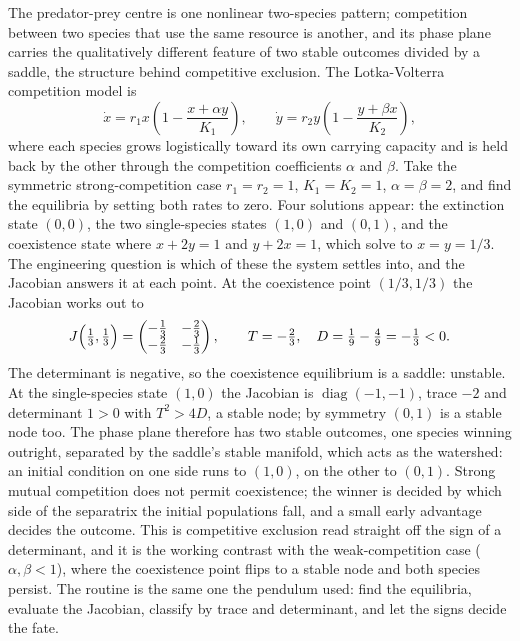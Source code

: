 The predator-prey centre is one nonlinear two-species pattern; competition
between two species that use the same resource is another, and its phase
plane carries the qualitatively different feature of two stable outcomes
divided by a saddle, the structure behind competitive exclusion. The
Lotka-Volterra competition model is
\[
\dot{x} = r_{1} x\left(1 - \frac{x + \alpha y}{K_{1}}\right),
\qquad
\dot{y} = r_{2} y\left(1 - \frac{y + \beta x}{K_{2}}\right),
\]
where each species grows logistically toward its own carrying capacity
and is held back by the other through the competition coefficients
$\alpha$ and $\beta$. Take the symmetric strong-competition case $r_{1} =
r_{2} = 1$, $K_{1} = K_{2} = 1$, $\alpha = \beta = 2$, and find the
equilibria by setting both rates to zero. Four solutions appear: the
extinction state $(0, 0)$, the two single-species states $(1, 0)$ and
$(0, 1)$, and the coexistence state where $x + 2y = 1$ and $y + 2x = 1$,
which solve to $x = y = 1/3$. The engineering question is which of these
the system settles into, and the Jacobian answers it at each point. At
the coexistence point $(1/3, 1/3)$ the Jacobian works out to
\[
J\Bigl(\tfrac13, \tfrac13\Bigr) = \begin{pmatrix}
-\tfrac13 & -\tfrac23 \\ -\tfrac23 & -\tfrac13
\end{pmatrix},
\qquad
T = -\tfrac23, \quad D = \tfrac19 - \tfrac49 = -\tfrac13 < 0.
\]
The determinant is negative, so the coexistence equilibrium is a saddle:
unstable. At the single-species state $(1, 0)$ the Jacobian is
$\operatorname{diag}(-1, -1)$, trace $-2$ and determinant $1 > 0$ with
$T^{2} > 4D$, a stable node; by symmetry $(0, 1)$ is a stable node too.
The phase plane therefore has two stable outcomes, one species winning
outright, separated by the saddle's stable manifold, which acts as the
watershed: an initial condition on one side runs to $(1, 0)$, on the
other to $(0, 1)$. Strong mutual competition does not permit coexistence;
the winner is decided by which side of the separatrix the initial
populations fall, and a small early advantage decides the outcome. This
is competitive exclusion read straight off the sign of a determinant, and
it is the working contrast with the weak-competition case ($\alpha,
\beta < 1$), where the coexistence point flips to a stable node and both
species persist. The routine is the same one the pendulum used: find the
equilibria, evaluate the Jacobian, classify by trace and determinant, and
let the signs decide the fate.

